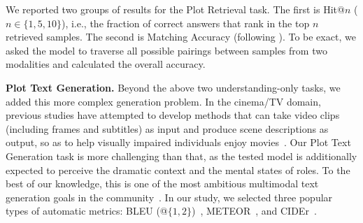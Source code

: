 We reported two groups of results for the Plot Retrieval task. The first is Hit@$n$ ($n \in \{1,5,10\}$), i.e., the fraction of correct answers that rank in the top $n$ retrieved samples.
The second is Matching Accuracy (following \citep{meter2022cvpr}). To be exact, we asked the model to traverse all possible pairings between samples from two modalities and calculated the overall accuracy.

\noindent\textbf{Plot Text Generation.} Beyond the above two understanding-only tasks, we added this more complex generation problem.
In the cinema/TV domain, previous studies have attempted to develop methods that can take video clips (including frames and subtitles) as input and produce scene descriptions as output, so as to help visually impaired individuals enjoy movies~\citep{vc12017itm,vc22020cvpr}. Our Plot Text Generation task is more challenging than that, as the tested model is additionally expected to perceive the dramatic context and the mental states of roles. To the best of our knowledge, this is one of the most ambitious multimodal text generation goals in the community~\citep{wang2021survey,zelaszczyk2023cross}.
In our study, we selected three popular types of automatic metrics: BLEU (@$\{1,2\}$)~\citep{bleu2002acl}, METEOR~\citep{meteor2005acl}, and CIDEr~\citep{cider2015cvpr}. 



